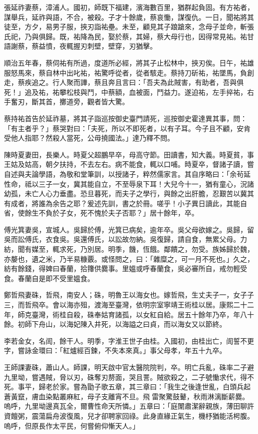\begin{pinyinscope}
張延祚妻蔡，漳浦人。國初，師既下福建，濱海數百里，猶群起負固。有方祐者，謀舉兵，延祚與語，不合，被殺。子才十餘歲，蔡哀慟，謀復仇。一日，聞祐將其徒至，方夕，易男子服，挾刃詣祐壘。未至，顧見其子踉蹌來，念母子並命，斬張氏祀，乃與俱歸。既，祐降為民，娶於蔡，其婦，蔡大母行也，因得常見祐。祐甘語謝蔡，蔡益憤，夜輒握刃刺壁，壁穿，刃猶擊。

順治五年春，蔡伺祐有所過，度道所必經，將其子止松林中，挾刃俟。日午，祐雄服怒馬來，蔡自林中出叱祐，祐驚呼從者，從者駭走。蔡持刀斫祐，祐墜馬，負創走，蔡疾追之。行人聚而譁，蔡且奔且言曰：「吾夫為此賊害，有助者，吾與俱死！」追及祐，祐攀松枝與鬥，中蔡額，血被面，鬥益力。遂迫祐，左手捽祐，右手奮刃，斷其首，擲道旁，觀者皆大驚。

蔡持祐首告於延祚墓，將其子詣巡按御史臺門請死，巡按御史霍達異其事，問：「有主者乎？」蔡哭對曰：「夫死，所以不即死者，以有子耳。今子且不顧，安肯受他人指耶？然殺人當死，公毋撓國法。」達乃釋不問。

陳時夏妻田，長樂人。時夏父超鵬早卒，母高守節。田讀書，知大義。時夏貧，事王姑及姑高，朝夕扶持，不去左右。病不能食，輒以口哺。時夏卒，督諸子讀，嘗自述與夫論學語，為敬和堂筆訓，以授諸子，粹然儒家言。其自序略曰：「余茍延性命，祗以三子一女，冀其能自立，不至辱泉下耳！大兒今十一，猶有童心，況諸幼孤，未亡人心力垂盡。恐旦暮死，而夫子之學行，與餘之出肝膽，忍艱苦以冀其有成者，將誰為余告之耶？爰述先訓，書之於冊。嗟乎！小子異日讀此，其能自省，使餘生不負於子女，死不愧於夫子否耶？」居十餘年，卒。

傅光箕妻吳，宣城人。吳歸於傅，光箕已病矣，逾年卒。吳父母欲嫁之。吳歸，留吳而訟傅氏，衣食吳。吳還傅氏，以訟故勿納。吳復歸，請自食，無累父母。力紡，聞有媒至，輒求死，乃別居。明季，饑，恆餓。鄰饋之，勿受。族姊歸於魏，亦嫠也，遺之米，乃半易糠覈。或怪問之，曰：「雜糜之，可一月不死也。」久之，紡有餘錢，得婢曰春蘭，拾籜供爨事。里媼或呼春蘭食，吳必審所自，戒勿輕受食。春蘭自是即不受里媼食。

鄭哲飛妻硃，哲飛，南安人；硃，明魯王以海女也。嫁哲飛，生丈夫子一，女子子三，而哲飛卒。會以海亦殂，渡海至臺灣，依明宗室寧靖王術桂以居。康熙二十二年，師克臺灣，術桂自殺，硃奉姑育諸孤，以女紅自給。居五十餘年乃卒，年八十餘。初師下舟山，以海妃陳入井死，以海謚之曰貞，而以海女又以節終。

李若金女，名訚，餘干人。明季，字淮王世子由桂。入國初，由桂出亡，訚誓不更字，嘗詠金環曰：「紅爐經百鍊，不失本來真。」事父母孝，年五十九卒。

王師課妻硃，蕭山人。師課，明天啟中官太醫院院判，卒。明亡兵亂，硃率二子避九里坳，嘗遇賊，脅以刃，硃奪刃剺面，哭且詈。賊欲殺之，二子號慟求代，得不死。事平，歸老於家。嘗為勖子歌五章，其三章曰：「我生之後逢世亂，白頭兵起蒼黃竄，膚血染點叢麻紅，母子支離宵不旦。飛雷聚驚鼓鼙，秋雨淋漓斷薪爨。嗚呼，九里坳邊真瓦全，爾曹性命天所憐。」五章曰：「庭闈肅潔辭親族，薄田聊許資饘粥，震蕩扁舟波復風，兒才卻聘家回祿。此身直緣正氣生，機杼猶能活枵腹。嗚呼，但原長作太平民，何嘗俯仰慚天人。」


\end{pinyinscope}
